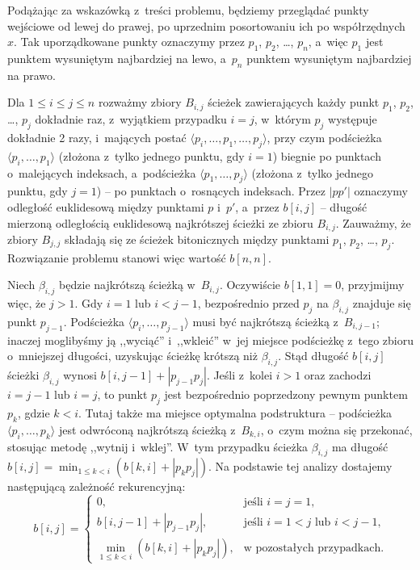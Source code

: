 Podążając za wskazówką z~treści problemu, będziemy przeglądać punkty wejściowe od lewej do prawej, po uprzednim posortowaniu ich po współrzędnych $x$.
Tak uporządkowane punkty oznaczymy przez $p_1$, $p_2$, \dots, $p_n$, a~więc $p_1$ jest punktem wysuniętym najbardziej na lewo, a~$p_n$ punktem wysuniętym najbardziej na prawo.

Dla $1\le i\le j\le n$ rozważmy zbiory $B_{i,j}$ ścieżek zawierających każdy punkt $p_1$, $p_2$, \dots, $p_j$ dokładnie raz, z~wyjątkiem przypadku $i=j$, w~którym $p_j$ występuje dokładnie 2 razy, i~mających postać $\langle p_i,\dots,p_1,\dots,p_j\rangle$, przy czym podścieżka $\langle p_i,\dots,p_1\rangle$ (złożona z~tylko jednego punktu, gdy $i=1$) biegnie po punktach o~malejących indeksach, a~podścieżka $\langle p_1,\dots,p_j\rangle$ (złożona z~tylko jednego punktu, gdy $j=1$) -- po punktach o~rosnących indeksach.
Przez $|pp'|$ oznaczymy odległość euklidesową między punktami $p$ i~$p'$, a~przez $b[i,j]$ -- długość mierzoną odległością euklidesową najkrótszej ścieżki ze zbioru $B_{i,j}$.
Zauważmy, że zbiory $B_{j,j}$ składają się ze ścieżek bitonicznych między punktami $p_1$, $p_2$, \dots, $p_j$.
Rozwiązanie problemu stanowi więc wartość $b[n,n]$.

Niech $\beta_{i,j}$ będzie najkrótszą ścieżką w~$B_{i,j}$.
Oczywiście $b[1,1]=0$, przyjmijmy więc, że $j>1$.
Gdy $i=1$ lub $i<j-1$, bezpośrednio przed $p_j$ na $\beta_{i,j}$ znajduje się punkt $p_{j-1}$.
Podścieżka $\langle p_i,\dots,p_{j-1}\rangle$ musi być najkrótszą ścieżką z~$B_{i,j-1}$; inaczej moglibyśmy ją ,,wyciąć'' i~,,wkleić'' w~jej miejsce podścieżkę z~tego zbioru o~mniejszej długości, uzyskując ścieżkę krótszą niż $\beta_{i,j}$.
Stąd długość $b[i,j]$ ścieżki $\beta_{i,j}$ wynosi $b[i,j-1]+|p_{j-1}p_j|$.
Jeśli z~kolei $i>1$ oraz zachodzi $i=j-1$ lub $i=j$, to punkt $p_j$ jest bezpośrednio poprzedzony pewnym punktem $p_k$, gdzie $k<i$.
Tutaj także ma miejsce optymalna podstruktura -- podścieżka $\langle p_i,\dots,p_k\rangle$ jest odwróconą najkrótszą ścieżką z~$B_{k,i}$, o~czym można się przekonać, stosując metodę ,,wytnij i~wklej''.
W~tym przypadku ścieżka $\beta_{i,j}$ ma długość $b[i,j]=\min_{1\le k<i}(b[k,i]+|p_kp_j|)$.
Na podstawie tej analizy dostajemy następującą zależność rekurencyjną:
\[
	b[i,j] = \begin{cases}
		0, & \text{jeśli $i=j=1$}, \\
		b[i,j-1]+|p_{j-1}p_j|, & \text{jeśli $i=1<j$ lub $i<j-1$}, \\
		\displaystyle\min_{1\le k<i}(b[k,i]+|p_kp_j|), & \text{w~pozostałych przypadkach}.
	\end{cases}
\]

